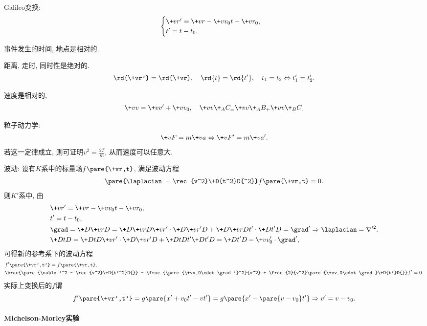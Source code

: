 \documentclass[hidelinks]{ctexart}
\begin{document}
\begin{cenum}
    \item Galileo变换:
    \[ \begin{cases}
        \+vr' = \+vr - \+vv_0 t - \+vr_0, \\
        t' = t-t_0.
    \end{cases} \]
    \begin{cenum}
        \item 事件发生的时间, 地点是相对的.
        \item 距离, 走时, 同时性是绝对的.
        \[ \rd{\+vr'} = \rd{\+vr},\quad \rd{t} = \rd{t'},\quad  t_1 = t_2 \Leftrightarrow t'_1 = t'_2. \]
        \item 速度是相对的,
        \[ \+vv = \+vv' + \+vv_0,\quad \+vv\+_AC_ = \+vv\+_AB_ + \+vv\+_BC_. \]
    \end{cenum}
    \item 粒子动力学:
    \[ \+vF = m\+va \Leftrightarrow \+vF' = m\+va'. \]
    若这一定律成立, 则可证明$\displaystyle v^2 = \frac{2T}{m}$, 从而速度可以任意大.
    \item 波动: 设有$K$系中的标量场$f\pare{\+vr,t}$, 满足波动方程
    \[ \pare{\laplacian - \rec{v^2}\+D{t^2}D{^2}}f\pare{\+vr,t} = 0. \]
    则$K'$系中, 由
    \begin{align*}
        & \+vr' = \+vr - \+vv_0 t - \+vr_0, \\
        & t' = t - t_0, \\
        & \grad = \+D{\+vr}D{} = \+D{\+vr}D{\+vr'}\cdot \+D{\+vr'}D{} + \+D{\+vr}D{t'}\cdot \+D{t'}D{} = \grad' \Rightarrow \laplacian = \nabla'^2. \\
        & \+DtD{} = \+DtD{\+vr'}\cdot\+D{\+vr'}D{} + \+DtD{t'}\+D{t'}D{} = \+D{t'}D{} - \+vv'_0 \cdot \grad',
    \end{align*}
    可得新的参考系下的波动方程
    \begin{align*}
        & f'\pare{\+vr',t'} = f\pare{\+vr,t}, \\
        & \brac{\pare{\nabla'^2 - \rec{v^2}\+D{t'^2}D{}} - \frac{\pare{\+vv_0\cdot \grad'}^2}{v^2} + \frac{2}{v^2}\pare{\+vv_0\cdot \grad}\+D{t'}D{}}f' = 0.
    \end{align*}
    实际上变换后的$f$谓
    \[ f'\pare{\+vr',t'} = g\pare{x' + v_0 t' - vt'} = g\pare{x' - \pare{v-v_0}t'} \Rightarrow v' = v-v_0. \]
\end{cenum}

\paragraph{Michelson-Morley实验} %
\label{par:michelson_morley实验}
\end{document}
